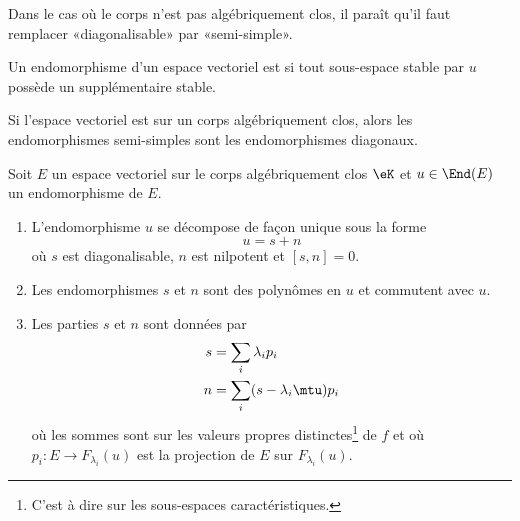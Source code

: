 \begin{probleme}
    Dans le cas où le corps n'est pas algébriquement clos, il paraît qu'il faut remplacer «diagonalisable» par «semi-simple».
\end{probleme}

\begin{definition}
    Un endomorphisme d'un espace vectoriel est  si tout sous-espace stable par \( u\) possède un supplémentaire stable.
\end{definition}
Si l'espace vectoriel est sur un corps algébriquement clos, alors les endomorphismes semi-simples sont les endomorphismes diagonaux.


\begin{theorem} \label{ThoRURcpW}
    Soit \( E\) un espace vectoriel sur le corps algébriquement clos \( \eK\) et \( u\in\End(E)\) un endomorphisme de \( E\). 
    
    \begin{enumerate}
        \item
            
            L'endomorphisme \( u\) se décompose de façon unique sous la forme
            \begin{equation}
                u=s+n
            \end{equation}
            où \( s\) est diagonalisable, \( n\) est nilpotent et \( [s,n]=0\).
        \item
            Les endomorphismes \( s\) et \( n\) sont des polynômes en \( u\) et commutent avec \( u\).
        \item   \label{ItemThoRURcpWiii}
            Les parties \( s\) et \( n\) sont données par
            \begin{subequations}
                \begin{align}
                    s&=\sum_i\lambda_ip_i\\
                    n&=\sum_i(s-\lambda_i\mtu)p_i
                \end{align}
            \end{subequations}
            où les sommes sont sur les valeurs propres distinctes\footnote{C'est à dire sur les sous-espaces caractéristiques.} de \( f\) et où \( p_i\colon E\to F_{\lambda_i}(u)\) est la projection de \( E\) sur \( F_{\lambda_i}(u)\).
    \end{enumerate}
\end{theorem}

